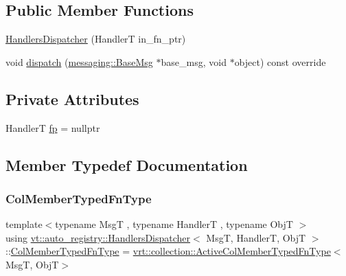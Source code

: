 \subsection*{Public Member Functions}
\begin{DoxyCompactItemize}
\item 
\hyperlink{structvt_1_1auto__registry_1_1_handlers_dispatcher_aea820469903ae2c06a6e9934d3e8d0cc}{Handlers\+Dispatcher} (HandlerT in\+\_\+fn\+\_\+ptr)
\item 
void \hyperlink{structvt_1_1auto__registry_1_1_handlers_dispatcher_a3139ff15aaf26b383dad67114c785b95}{dispatch} (\hyperlink{structvt_1_1messaging_1_1_base_msg}{messaging\+::\+Base\+Msg} $\ast$base\+\_\+msg, void $\ast$object) const override
\end{DoxyCompactItemize}
\subsection*{Private Attributes}
\begin{DoxyCompactItemize}
\item 
HandlerT \hyperlink{structvt_1_1auto__registry_1_1_handlers_dispatcher_a2fe52dbcfedb744c43a0579de7c7167f}{fp} = nullptr
\end{DoxyCompactItemize}


\subsection{Member Typedef Documentation}
\mbox{\label{structvt_1_1auto__registry_1_1_handlers_dispatcher_a6f1a72ba3eec14527af044a478416b4d}} 
\subsubsection{\texorpdfstring{Col\+Member\+Typed\+Fn\+Type}{ColMemberTypedFnType}}
{\footnotesize\ttfamily template$<$typename MsgT , typename HandlerT , typename ObjT $>$ \\
using \hyperlink{structvt_1_1auto__registry_1_1_handlers_dispatcher}{vt\+::auto\+\_\+registry\+::\+Handlers\+Dispatcher}$<$ MsgT, HandlerT, ObjT $>$\+::\hyperlink{structvt_1_1auto__registry_1_1_handlers_dispatcher_a6f1a72ba3eec14527af044a478416b4d}{Col\+Member\+Typed\+Fn\+Type} =  \hyperlink{namespacevt_1_1vrt_1_1collection_a87925616c03cf4ccc548d33b2fe172ee}{vrt\+::collection\+::\+Active\+Col\+Member\+Typed\+Fn\+Type}$<$MsgT, ObjT$>$}

